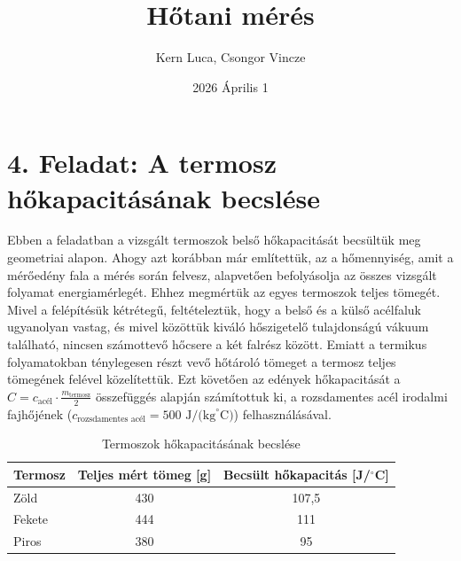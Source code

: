 \documentclass{article}
\title{Hőtani mérés}
\author{Kern Luca, Csongor Vincze}
\date{2026 Április 1}
\begin{document}
\maketitle

\section*{4. Feladat: A termosz hőkapacitásának becslése}


Ebben a feladatban a vizsgált termoszok belső hőkapacitását becsültük meg geometriai alapon. Ahogy azt korábban már említettük, az a hőmennyiség, amit a mérőedény fala a mérés során felvesz, alapvetően befolyásolja az összes vizsgált folyamat energiamérlegét. Ehhez megmértük az egyes termoszok teljes tömegét. Mivel a felépítésük kétrétegű, feltételeztük, hogy a belső és a külső acélfaluk ugyanolyan vastag, és mivel közöttük kiváló hőszigetelő tulajdonságú vákuum található, nincsen számottevő hőcsere a két falrész között. Emiatt a termikus folyamatokban ténylegesen részt vevő hőtároló tömeget a termosz teljes tömegének felével közelítettük. Ezt követően az edények hőkapacitását a $C = c_{\text{acél}} \cdot \frac{m_{\text{termosz}}}{2}$ összefüggés alapján számítottuk ki, a rozsdamentes acél irodalmi fajhőjének ($c_{\text{rozsdamentes acél}} = 500 \text{ J/(kg}^{\circ}\text{C)}$) felhasználásával.

\begin{table}[H]
    \centering
    \begin{tabular}{|l|c|c|}
        \hline
        Termosz & Teljes mért tömeg [g] & Becsült hőkapacitás [J/$^{\circ}$C] \\\hline
        Zöld & 430 & 107,5 \\ \hline
        Fekete & 444 & 111 \\ \hline
        Piros & 380 & 95 \\ \hline
    \end{tabular}
    \caption{Termoszok hőkapacitásának becslése}
    \label{tab:hotan_4}
\end{table}

\end{document}
